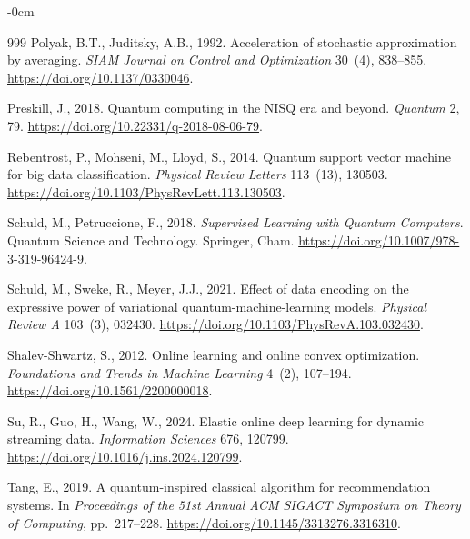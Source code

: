 \documentclass[sensors,article,submit,pdftex,moreauthors]{Definitions/mdpi}
\providecommand{\DIFadd}[1]{{\protect\color{blue}#1}} %
\providecommand{\DIFdel}[1]{} %
\providecommand{\DIFaddbegin}{} %
\providecommand{\DIFaddend}{} %
\providecommand{\DIFdelbegin}{} %
\providecommand{\DIFdelend}{} %
\begin{document}
\begin{adjustwidth}{-\extralength}{0cm}
\begin{thebibliography}{999}
Polyak, B.T., Juditsky, A.B., 1992.
\newblock Acceleration of stochastic approximation by averaging.
\newblock \emph{SIAM Journal on Control and Optimization} 30~(4), 838--855.
\newblock \url{https://doi.org/10.1137/0330046}.

Preskill, J., 2018.
\newblock Quantum computing in the NISQ era and beyond.
\newblock \emph{Quantum} 2, 79.
\newblock \url{https://doi.org/10.22331/q-2018-08-06-79}.

Rebentrost, P., Mohseni, M., Lloyd, S., 2014.
\newblock Quantum support vector machine for big data classification.
\newblock \emph{Physical Review Letters} 113~(13), 130503.
\newblock \url{https://doi.org/10.1103/PhysRevLett.113.130503}.

Schuld, M., Petruccione, F., 2018.
\newblock \emph{Supervised Learning with Quantum Computers}.
\newblock Quantum Science and Technology. Springer, Cham.
\newblock \url{https://doi.org/10.1007/978-3-319-96424-9}.

Schuld, M., Sweke, R., Meyer, J.J., 2021.
\newblock Effect of data encoding on the expressive power of variational quantum-machine-learning models.
\newblock \emph{Physical Review A} 103~(3), 032430.
\newblock \url{https://doi.org/10.1103/PhysRevA.103.032430}.

Shalev-Shwartz, S., 2012.
\newblock Online learning and online convex optimization.
\newblock \emph{Foundations and Trends in Machine Learning} 4~(2), 107--194.
\newblock \url{https://doi.org/10.1561/2200000018}.

Su, R., Guo, H., Wang, W., 2024.
\newblock Elastic online deep learning for dynamic streaming data.
\newblock \emph{Information Sciences} 676, \DIFdelbegin \DIFdel{120783.
}\DIFdelend \DIFaddbegin \DIFadd{120799.
}\DIFaddend \newblock \DIFdelbegin %
\DIFdelend \DIFaddbegin \url{https://doi.org/10.1016/j.ins.2024.120799}\DIFaddend .

Tang, E., 2019.
\newblock A quantum-inspired classical algorithm for recommendation systems.
\newblock In \emph{Proceedings of the 51st Annual ACM SIGACT Symposium on Theory of Computing}, pp.~217--228.
\newblock \url{https://doi.org/10.1145/3313276.3316310}.


\end{thebibliography}
\end{adjustwidth}
\end{document}
